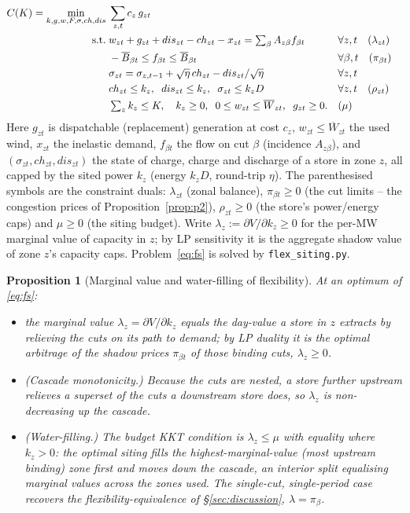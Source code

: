 \documentclass[review,3p,times]{elsarticle}
\theoremstyle{plain}
\newtheorem{proposition}{Proposition}
\theoremstyle{definition}
\begin{document}
\begin{align}
C(K)=\min_{k,g,w,F,\sigma,ch,dis}\;&
   \sum_{z,t} c_{z}\,g_{zt}
   \label{eq:fs}\\
\text{s.t.}\;&
   w_{zt}+g_{zt}+dis_{zt}-ch_{zt}-x_{zt}
   =\textstyle\sum_{\beta}A_{z\beta}f_{\beta t}
   && \forall z,t\quad(\lambda_{zt})\notag\\
&  -\overline B_{\beta t}\le f_{\beta t}\le\overline B_{\beta t}
   && \forall \beta,t\quad(\pi_{\beta t})\notag\\
&  \sigma_{zt}=\sigma_{z,t-1}+\sqrt{\eta}\,ch_{zt}-dis_{zt}/\sqrt{\eta}
   && \forall z,t\notag\\
&  ch_{zt}\le k_{z},\;\; dis_{zt}\le k_{z},\;\; \sigma_{zt}\le k_{z}D
   && \forall z,t\quad(\rho_{zt})\notag\\
&  \textstyle\sum_{z}k_{z}\le K,\quad k_z\ge0,\;\;
   0\le w_{zt}\le\overline W_{zt},\;\; g_{zt}\ge0.
   && (\mu)\notag
\end{align}
Here $g_{zt}$ is dispatchable (replacement) generation at
cost $c_{z}$, $w_{zt}\le\overline W_{zt}$ the used wind, $x_{zt}$ the inelastic
demand, $f_{\beta t}$ the flow on cut $\beta$ (incidence $A_{z\beta}$), and
$(\sigma_{zt},ch_{zt},dis_{zt})$ the state of charge, charge and discharge of a
store in zone $z$, all capped by the sited power $k_{z}$ (energy $k_zD$,
round-trip $\eta$). The parenthesised symbols are the constraint duals:
$\lambda_{zt}$ (zonal balance), $\pi_{\beta t}\ge0$ (the cut limits -- the
congestion prices of Proposition~\ref{prop:p2}), $\rho_{zt}\ge0$ (the store's
power/energy caps) and $\mu\ge0$ (the siting budget). Write
$\lambda_z:=\partial V/\partial k_z\ge0$ for the per-MW marginal value of capacity
in $z$; by LP sensitivity it is the aggregate shadow value of zone $z$'s capacity
caps. Problem~\eqref{eq:fs} is solved by \texttt{flex\_siting.py}.



\begin{proposition}[Marginal value and water-filling of flexibility]
\label{prop:p3}
At an optimum of \eqref{eq:fs}:
\begin{itemize}
\item[\emph{(i)}] the marginal value $\lambda_z=\partial V/\partial k_z$ equals the
day-value a store in $z$ extracts by relieving the cuts on its path to demand;
by LP duality it is the optimal arbitrage of the shadow prices $\pi_{\beta t}$ of
those binding cuts, $\lambda_z\ge0$.
\item[\emph{(ii)}]\emph{(Cascade monotonicity.)} Because the cuts are nested, a store
further upstream relieves a superset of the cuts a downstream store does, so
$\lambda_z$ is non-decreasing up the cascade.
\item[\emph{(iii)}] \emph{(Water-filling.)} The budget KKT condition is
$\lambda_z\le\mu$ with equality where $k_z>0$: the optimal siting fills the
highest-marginal-value (most upstream binding) zone first and moves down the
cascade, an interior split equalising marginal values across the zones used.
The single-cut, single-period case recovers the flexibility-equivalence of
\S\ref{sec:discussion}, $\lambda=\pi_\beta$.
\end{itemize}
\end{proposition}
\end{document}
